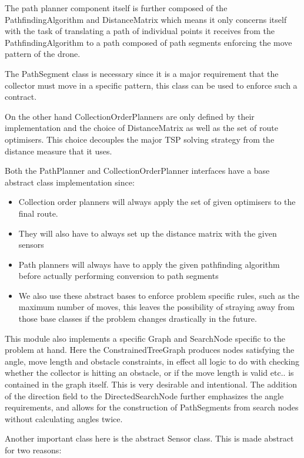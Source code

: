 \documentclass[10pt,a4paper]{article}
\begin{document}
\par 
The path planner component itself is further composed of the PathfindingAlgorithm and DistanceMatrix which means it only concerns itself with the 
task of translating a path of individual points it receives from the PathfindingAlgorithm to a path composed of path segments enforcing the move pattern of the drone.
\par
The PathSegment class is necessary since it is a major requirement that the collector must move in a specific pattern, this class can be used to enforce such a contract.
\par 
On the other hand CollectionOrderPlanners are only defined by their implementation and the choice of DistanceMatrix as well as the set of route optimisers. 
This choice decouples the major TSP solving strategy from the distance measure that it uses. 
\par
Both the PathPlanner and CollectionOrderPlanner interfaces have a base abstract class implementation since:
\begin{itemize}
    \item Collection order planners will always apply the set of given optimisers to the final route.
    \item They will also have to always set up the distance matrix with the given sensors 
    \item Path planners will always have to apply the given pathfinding algorithm before actually performing conversion to path segments
    \item We also use these abstract bases to enforce problem specific rules, such as the maximum number of moves, this leaves the possibility of
            straying away from those base classes if the problem changes drastically in the future.
\end{itemize}
\par 
This module also implements a specific Graph and SearchNode specific to the problem at hand. Here the ConstrainedTreeGraph produces nodes satisfying 
the angle, move length and obstacle constraints, in effect all logic to do with checking whether the collector is hitting an obstacle, or if the move length is valid etc.. is contained 
in the graph itself. This is very desirable and intentional. 
The addition of the direction field to the DirectedSearchNode further emphasizes the angle requirements, and allows for the construction of 
PathSegments from search nodes without calculating angles twice.
\par Another important class here is the abstract Sensor class. This is made abstract for two reasons:
\end{document}
